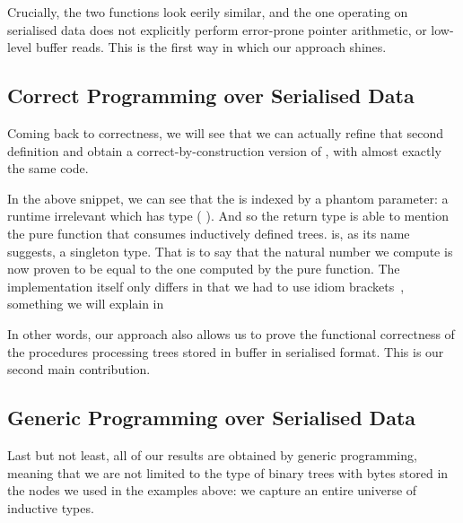 Crucially, the two functions look eerily similar, and the one operating on
serialised data does not explicitly perform error-prone pointer arithmetic,
or low-level buffer reads. This is the first way in which our approach shines.


\subsection{Correct Programming over Serialised Data}

Coming back to correctness, we will see that we can actually refine that
second definition and obtain a correct-by-construction version of
, with almost exactly the same code.

\begin{center}
  \begin{minipage}{.7\textwidth}
  \end{minipage}
\end{center}

In the above snippet, we can see that the  is indexed
by a phantom parameter: a runtime irrelevant  which has type
( ).
%
And so the return type is able to mention the pure 
function that consumes inductively defined trees.
%
 is, as its name suggests, a singleton type. That is
to say that the natural number we compute is now proven to be equal to the
one computed by the pure  function.
%
The implementation itself only differs in that we had to use idiom
brackets~\cite{DBLP:journals/jfp/McbrideP08}, something we will explain
in 

In other words, our approach also allows us to prove the functional
correctness of the  procedures processing trees stored
in buffer in serialised format. This is our second main contribution.

\subsection{Generic Programming over Serialised Data}

Last but not least, all of our results are obtained by generic programming,
meaning that we are not limited to the type of binary trees with bytes stored
in the nodes we used in the examples above: we capture an entire universe of
inductive types.

